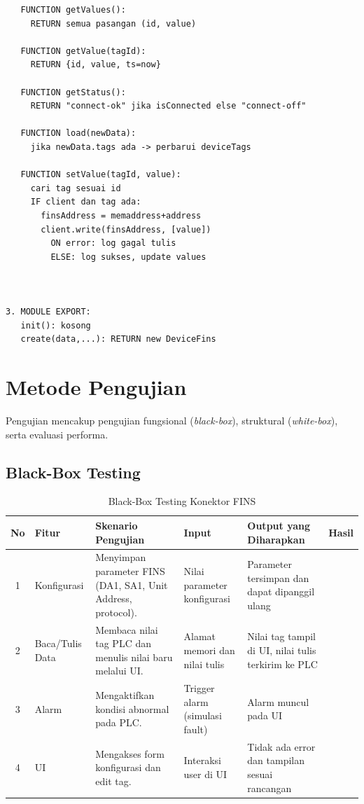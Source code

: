 \begin{verbatim}
   FUNCTION getValues():
     RETURN semua pasangan (id, value)

   FUNCTION getValue(tagId):
     RETURN {id, value, ts=now}

   FUNCTION getStatus():
     RETURN "connect-ok" jika isConnected else "connect-off"

   FUNCTION load(newData):
     jika newData.tags ada -> perbarui deviceTags

   FUNCTION setValue(tagId, value):
     cari tag sesuai id
     IF client dan tag ada:
       finsAddress = memaddress+address
       client.write(finsAddress, [value])
         ON error: log gagal tulis
         ELSE: log sukses, update values

   

3. MODULE EXPORT:
   init(): kosong
   create(data,...): RETURN new DeviceFins
\end{verbatim}

\section{Metode Pengujian}
Pengujian mencakup pengujian fungsional (\textit{black-box}), struktural (\textit{white-box}), serta evaluasi performa.

\subsection{Black-Box Testing}
\begin{table}[H]
    \centering
    \begin{tabular}{|c|p{2cm}|p{3.5cm}|p{3cm}|p{3cm}|p{2cm}|}
        \hline
        \textbf{No} & \textbf{Fitur} & \textbf{Skenario Pengujian} & \textbf{Input} & \textbf{Output yang Diharapkan} & \textbf{Hasil} \\
        \hline
        1 & Konfigurasi & Menyimpan parameter FINS (DA1, SA1, Unit Address, protocol). & Nilai parameter konfigurasi & Parameter tersimpan dan dapat dipanggil ulang &  \\
        \hline
        2 & Baca/Tulis Data & Membaca nilai tag PLC dan menulis nilai baru melalui UI. & Alamat memori dan nilai tulis & Nilai tag tampil di UI, nilai tulis terkirim ke PLC &  \\
        \hline
        3 & Alarm & Mengaktifkan kondisi abnormal pada PLC. & Trigger alarm (simulasi fault) & Alarm muncul pada UI &  \\
        \hline
        4 & UI & Mengakses form konfigurasi dan edit tag. & Interaksi user di UI & Tidak ada error dan tampilan sesuai rancangan & \\
        \hline
    \end{tabular}
    \caption{Black-Box Testing Konektor FINS}
    \label{tab:blackbox}
\end{table}

